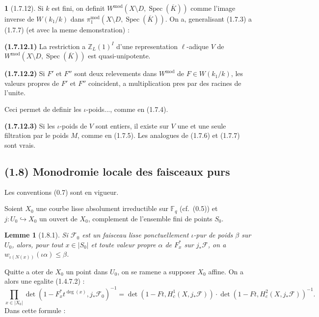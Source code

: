 \documentclass[12pt,a4paper]{article}
\theoremstyle{plain}
\newtheorem{lemme}[theorem]{Lemme}
\theoremstyle{definition}
\theoremstyle{definition}
\newtheorem{para}{}[section]
\theoremstyle{remark}
\DeclareMathOperator{\Spec}{Spec}
\begin{document}
\begin{para}[1.7.12]
Si $k$ est fini, on definit $W^{\text{mod}}(X \setminus D, \Spec(\overline{K}))$ comme l'image inverse de $W(k_1/k)$ dans $\pi_1^{\text{mod}}(X \setminus D, \Spec(\overline{K}))$. On a, generalisant (1.7.3) a (1.7.7) (et avec la meme demonstration) :

\textbf{(1.7.12.1)} La restriction a $\mathbb{Z}_L(1)^I$ d'une representation $\ell$-adique $V$ de $W^{\text{mod}}(X \setminus D, \Spec(\overline{K}))$ est quasi-unipotente.

\textbf{(1.7.12.2)} Si $F'$ et $F''$ sont deux relevements dans $W^{\text{mod}}$ de $F \in W(k_1/k)$, les valeurs propres de $F'$ et $F''$ coincident, a multiplication pres par des racines de l'unite.

Ceci permet de definir les $\iota$-poids..., comme en (1.7.4).

\textbf{(1.7.12.3)} Si les $\iota$-poids de $V$ sont entiers, il existe sur $V$ une et une seule filtration par le poids $M$, comme en (1.7.5). Les analogues de (1.7.6) et (1.7.7) sont vrais.
\end{para}

\newpage

\subsection*{(1.8) Monodromie locale des faisceaux purs}

Les conventions (0.7) sont en vigueur.

Soient $X_0$ une courbe lisse absolument irreductible sur $\mathbb{F}_q$ (cf.~(0.5)) et $j: U_0 \hookrightarrow X_0$ un ouvert de $X_0$, complement de l'ensemble fini de points $S_0$.

\begin{lemme}[1.8.1]
Si $\mathscr{F}_0$ est un faisceau lisse ponctuellement $\iota$-pur de poids $\beta$ sur $U_0$, alors, pour tout $x \in |S_0|$ et toute valeur propre $\alpha$ de $F_x^*$ sur $j_* \mathscr{F}$, on a $w_{\iota(N(x))}(\iota\alpha) \leq \beta$.
\end{lemme}

Quitte a oter de $X_0$ un point dans $U_0$, on se ramene a supposer $X_0$ affine. On a alors une egalite (1.4.7.2) :
\begin{equation}\tag{1.8.1.1}
\prod_{x \in |X_0|} \det(1 - F_x^* t^{\deg(x)}, j_* \mathscr{F}_0)^{-1} = \det(1 - Ft, H_c^1(X, j_* \mathscr{F})) \cdot \det(1 - Ft, H_c^2(X, j_* \mathscr{F}))^{-1}.
\end{equation}
Dans cette formule :
\end{document}
